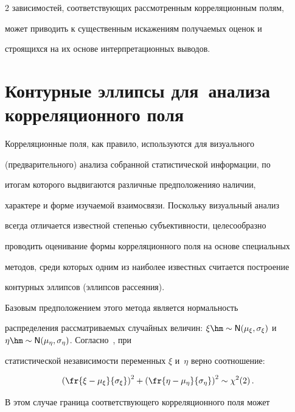 \begin{multicols}{2}
зависимостей, соответ\-ст\-ву\-ющих рассмотренным корреляционным полям,

может приводить к существенным искажениям получаемых оценок и

строящихся на их основе интерпретационных выводов.



\section{Контурные эллипсы для~анализа корреляционного поля}



  Корреляционные поля, как правило, используются для визуального

(предварительного) анализа собранной статистической информации, по

итогам которого выдвигаются различные предположения\linebreak о наличии,

характере и форме изучаемой взаимосвязи. Поскольку визуальный анализ

всегда отличается известной степенью субъективности, целесо\-образно

проводить оценивание формы корреляционного поля на основе специальных

методов, среди которых одним из наиболее известных считается построение

контурных эллипсов (эл\-лип\-сов рассеяния).



  Базовым предположением этого метода является нормальность

распределения рассматриваемых случайных величин: $\xi\hm\sim

{\sf N}(\mu_\xi, \sigma_\xi)$ и $\eta\hm\sim

{\sf N}(\mu_\eta,\sigma_\eta)$. Согласно~\cite{6-tim}, при

статистической независимости переменных $\xi$ и~$\eta$ верно соотношение:

  \begin{equation}

  \left( \fr{\xi-\mu_\xi}{\sigma_\xi}\right)^2+ \left( \fr{\eta-\mu_\eta}

{\sigma_\eta} \right)^2 \sim \chi^2 (2)\,.

  \label{e3-tim}

  \end{equation}



  В этом случае граница соответствующего корреляционного поля может


\end{multicols}
